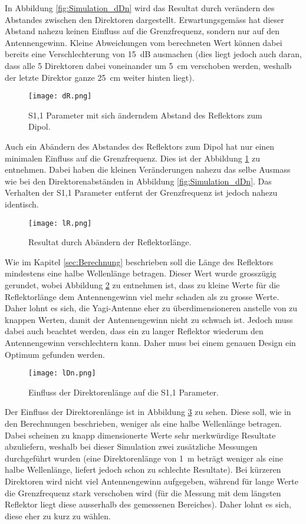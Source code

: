 In Abbildung \ref{fig:Simulation_dDn} wird das Resultat durch verändern des Abstandes zwischen den Direktoren dargestellt. Erwartungsgemäss hat dieser Abstand nahezu keinen Einfluss auf die Grenzfrequenz, sondern nur auf den Antennengewinn. Kleine Abweichungen vom berechneten Wert können dabei bereits eine Verschlechterung von \SI{15}{dB} ausmachen (dies liegt jedoch auch daran, dass alle 5 Direktoren dabei voneinander um \SI{5}{cm} verschoben werden, weshalb der letzte Direktor ganze \SI{25}{cm} weiter hinten liegt).

\begin{figure}[h!]
	\centering
	\texttt{[image: dR.png]}
	\caption{S1,1 Parameter mit sich änderndem Abstand des Reflektors zum Dipol.}
	\label{fig:Simulation_dR}
\end{figure}

Auch ein Abändern des Abstandes des Reflektors zum Dipol hat nur einen minimalen Einfluss auf die Grenzfrequenz. Dies ist der Abbildung \ref{fig:Simulation_dR} zu entnehmen. Dabei haben die kleinen Veränderungen nahezu das selbe Ausmass wie bei den Direktorenabständen in Abbildung \ref{fig:Simulation_dDn}. Das Verhalten der S1,1 Parameter entfernt der Grenzfrequenz ist jedoch nahezu identisch.

\begin{figure}[h!]
	\centering
	\texttt{[image: lR.png]}
	\caption{Resultat durch Abändern der Reflektorlänge.}
	\label{fig:Simulation_lR}
\end{figure}

Wie im Kapitel \ref{sec:Berechnung} beschrieben soll die Länge des Reflektors mindestens eine halbe Wellenlänge betragen. Dieser Wert wurde grosszügig gerundet, wobei Abbildung \ref{fig:Simulation_lR} zu entnehmen ist, dass zu kleine Werte für die Reflektorlänge dem Antennengewinn viel mehr schaden als zu grosse Werte. Daher lohnt es sich, die Yagi-Antenne eher zu überdimensioneren anstelle von zu knappen Werten, damit der Antennengewinn nicht zu schwach ist. Jedoch muss dabei auch beachtet werden, dass ein zu langer Reflektor wiederum den Antennengewinn verschlechtern kann. Daher muss bei einem genauen Design ein Optimum gefunden werden.

\begin{figure}[h!]
	\centering
	\texttt{[image: lDn.png]}
	\caption{Einfluss der Direktorenlänge auf die S1,1 Parameter.}
	\label{fig:Simulation_lDn}
\end{figure}

Der Einfluss der Direktorenlänge ist in Abbildung \ref{fig:Simulation_lDn} zu sehen. Diese soll, wie in den Berechnungen beschrieben, weniger als eine halbe Wellenlänge betragen. Dabei scheinen zu knapp dimensionerte Werte sehr merkwürdige Resultate abzuliefern, weshalb bei dieser Simulation zwei zusätzliche Messungen durchgeführt wurden (eine Direktorenlänge von \SI{1}{m} beträgt weniger als eine halbe Wellenlänge, liefert jedoch schon zu schlechte Resultate). Bei kürzeren Direktoren wird nicht viel Antennengewinn aufgegeben, während für lange Werte die Grenzfrequenz stark verschoben wird (für die Messung mit dem längsten Reflektor liegt diese ausserhalb des gemessenen Bereiches). Daher lohnt es sich, diese eher zu kurz zu wählen.

